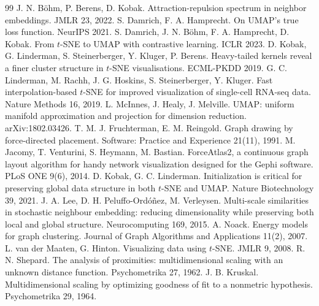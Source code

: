 \documentclass[11pt]{article}
\begin{document}

\begin{thebibliography}{99}\small
{} J. N. B\"ohm, P. Berens, D. Kobak. Attraction-repulsion spectrum in neighbor embeddings. JMLR 23, 2022.
 S. Damrich, F. A. Hamprecht. On UMAP's true loss function. NeurIPS 2021.
 S. Damrich, J. N. B\"ohm, F. A. Hamprecht, D. Kobak. From $t$-SNE to UMAP with contrastive learning. ICLR 2023.
 D. Kobak, G. Linderman, S. Steinerberger, Y. Kluger, P. Berens. Heavy-tailed kernels reveal a finer cluster structure in $t$-SNE visualisations. ECML-PKDD 2019.
 G. C. Linderman, M. Rachh, J. G. Hoskins, S. Steinerberger, Y. Kluger. Fast interpolation-based $t$-SNE for improved visualization of single-cell RNA-seq data. Nature Methods 16, 2019.
 L. McInnes, J. Healy, J. Melville. UMAP: uniform manifold approximation and projection for dimension reduction. arXiv:1802.03426.
 T. M. J. Fruchterman, E. M. Reingold. Graph drawing by force-directed placement. Software: Practice and Experience 21(11), 1991.
 M. Jacomy, T. Venturini, S. Heymann, M. Bastian. ForceAtlas2, a continuous graph layout algorithm for handy network visualization designed for the Gephi software. PLoS ONE 9(6), 2014.
 D. Kobak, G. C. Linderman. Initialization is critical for preserving global data structure in both $t$-SNE and UMAP. Nature Biotechnology 39, 2021.
 J. A. Lee, D. H. Peluffo-Ord\'o\~nez, M. Verleysen. Multi-scale similarities in stochastic neighbour embedding: reducing dimensionality while preserving both local and global structure. Neurocomputing 169, 2015.
 A. Noack. Energy models for graph clustering. Journal of Graph Algorithms and Applications 11(2), 2007.
 L. van der Maaten, G. Hinton. Visualizing data using $t$-SNE. JMLR 9, 2008.
 R. N. Shepard. The analysis of proximities: multidimensional scaling with an unknown distance function. Psychometrika 27, 1962.
 J. B. Kruskal. Multidimensional scaling by optimizing goodness of fit to a nonmetric hypothesis. Psychometrika 29, 1964.

\end{thebibliography}
\end{document}
